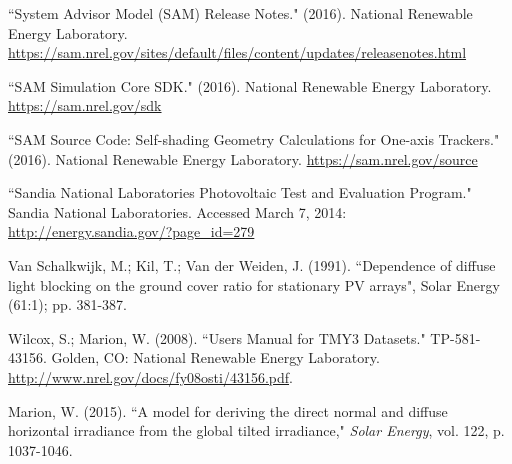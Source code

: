\documentclass[12pt,letterpaper]{article}
\begin{document}
\begin{thebibliography}{99}
 ``System Advisor Model (SAM) Release Notes." (2016). National Renewable Energy Laboratory. \url{https://sam.nrel.gov/sites/default/files/content/updates/releasenotes.html}

 ``SAM Simulation Core SDK." (2016). National Renewable Energy Laboratory. \url{https://sam.nrel.gov/sdk}

 ``SAM Source Code: Self-shading Geometry Calculations for One-axis Trackers." (2016). National Renewable Energy Laboratory. \url{https://sam.nrel.gov/source}

 ``Sandia National Laboratories Photovoltaic Test and Evaluation Program." Sandia National Laboratories. Accessed March 7, 2014: \url{http://energy.sandia.gov/?page_id=279}

 Van Schalkwijk, M.; Kil, T.; Van der Weiden, J. (1991). ``Dependence of diffuse light blocking on the ground cover ratio for stationary PV arrays", Solar Energy (61:1); pp. 381-387.

 Wilcox, S.; Marion, W. (2008). ``Users Manual for TMY3 Datasets." TP-581-43156. Golden, CO: National Renewable Energy Laboratory. \url{http://www.nrel.gov/docs/fy08osti/43156.pdf}.

Marion, W. (2015). ``A model for deriving the direct normal and diffuse horizontal irradiance from the global tilted irradiance," \emph{Solar Energy}, vol. 122, p. 1037-1046.


\end{thebibliography}
\end{document}

